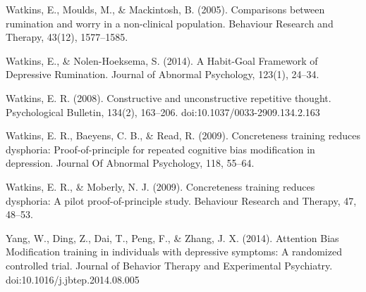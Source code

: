 \documentclass[man,a4paper]{apa6}
\begin{document}
Watkins, E., Moulds, M., \& Mackintosh, B. (2005). Comparisons between rumination and worry in a non-clinical population. Behaviour Research and Therapy, 43(12), 1577--1585.

Watkins, E., \& Nolen-Hoeksema, S. (2014). A Habit-Goal Framework of Depressive Rumination. Journal of Abnormal Psychology, 123(1), 24--34.

Watkins, E. R. (2008). Constructive and unconstructive repetitive thought. Psychological Bulletin, 134(2), 163--206. doi:10.1037/0033-2909.134.2.163

Watkins, E. R., Baeyens, C. B., \& Read, R. (2009). Concreteness training reduces dysphoria: Proof-of-principle for repeated cognitive bias modification in depression. Journal Of Abnormal Psychology, 118, 55--64.

Watkins, E. R., \& Moberly, N. J. (2009). Concreteness training reduces dysphoria: A pilot proof-of-principle study. Behaviour Research and Therapy, 47, 48--53.

Yang, W., Ding, Z., Dai, T., Peng, F., \& Zhang, J. X. (2014). Attention Bias Modification training in individuals with depressive symptoms: A randomized controlled trial. Journal of Behavior Therapy and Experimental Psychiatry. doi:10.1016/j.jbtep.2014.08.005
\end{document}
